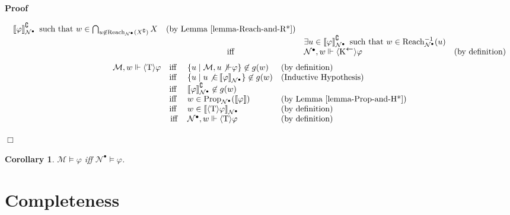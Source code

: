 \documentclass{article}
\newcommand{\nin}{\not\in}
\newcommand{\tmmathbf}[1]{\ensuremath{\boldsymbol{#1}}}
\newcommand{\tmop}[1]{\ensuremath{\operatorname{#1}}}
\newcommand{\tmtextbf}[1]{\text{{\bfseries{#1}}}}
\newenvironment{proof}{\noindent\textbf{Proof\ }}{\hspace*{\fill}$\Box$\medskip}
\newtheorem{corollary}{Corollary}
\newcommand{\Model}{\ensuremath{\mathcal{M}}}
\newcommand{\Net}{\ensuremath{\mathcal{N}}}
\newcommand{\semantics}[1]{\left\llbracket #1 \right\rrbracket}
\newcommand{\diaKnownby}{\langle \tmmathbf{\text{K}^{\leftarrow}} \rangle}
\newcommand{\diaTyp}{\langle \tmmathbf{\text{T}} \rangle}
\newcommand{\Reach}{\textsf{\tmop{Reach}}}
\newcommand{\Prop}{\textsf{\tmop{Prop}}}
\begin{document}
\begin{proof}
\begin{description}
\[\begin{array}{lcll}
         \semantics{\varphi}_{\Net^{\bullet}}^{\complement} \text{ such that }
         w \in \bigcap_{u \not{\in} \Reach_{\Net^{\bullet}} (X^{\complement})}
         X & \text{(by Lemma \ref{lemma-Reach-and-R*})}\\
         &  & \exists u \in
         \semantics{\varphi}_{\Net^{\bullet}}^{\complement} \text{ such that }
         w \in \Reach_{\Net^{\bullet}}^{- 1} (u) & \\
         & \tmop{iff} & \Net^{\bullet}, w \Vdash \diaKnownby \varphi &
         \text{(by definition)}
       \end{array} \]
    \tmtextbf{$\diaTyp \varphi$ case:}
    \[ \begin{array}{lcll}
         \Model, w \Vdash \diaTyp \varphi & \text{iff } & \left\{ u \mid
         \Model, u \not{\Vdash} \varphi \right\} \nin g (w) & \text{(by
         definition)}\\
         & \text{iff } & \left\{ u \mid u \not{\in}
         \semantics{\varphi}_{\Net^{\bullet}} \right\} \nin g (w) &
         \text{(Inductive Hypothesis)}\\
         & \text{iff } & \semantics{\varphi}_{\Net^{\bullet}}^{\complement}
         \nin g (w) & \\
         & \text{iff } & w \in \Prop_{\Net^{\bullet}} (\semantics{\varphi}) &
         \text{(by Lemma \ref{lemma-Prop-and-H*})}\\
         & \text{iff } & w \in \semantics{\diaTyp \varphi}_{\Net^{\bullet}} &
         \text{(by definition)}\\
         & \tmop{iff} & \Net^{\bullet}, w \Vdash \diaTyp \varphi & \text{(by
         definition)}
       \end{array} \]
  \end{description}
  
\end{proof}

\begin{corollary}
  {\Model}$\models \varphi$ iff $\Net^{\bullet} \models \varphi$.
\end{corollary}

\section{Completeness}
\end{document}
